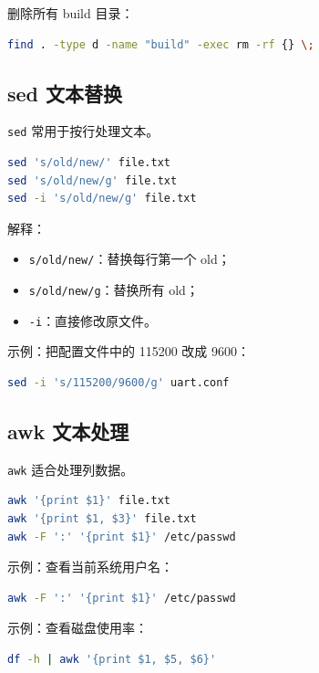 \documentclass[UTF8,a4paper,12pt]{ctexart}
\begin{document}
删除所有 build 目录：

\begin{lstlisting}[language=bash]
find . -type d -name "build" -exec rm -rf {} \;
\end{lstlisting}

\subsection{sed 文本替换}

\texttt{sed} 常用于按行处理文本。

\begin{lstlisting}[language=bash]
sed 's/old/new/' file.txt
sed 's/old/new/g' file.txt
sed -i 's/old/new/g' file.txt
\end{lstlisting}

解释：
\begin{itemize}
    \item \texttt{s/old/new/}：替换每行第一个 old；
    \item \texttt{s/old/new/g}：替换所有 old；
    \item \texttt{-i}：直接修改原文件。
\end{itemize}

示例：把配置文件中的 115200 改成 9600：

\begin{lstlisting}[language=bash]
sed -i 's/115200/9600/g' uart.conf
\end{lstlisting}

\subsection{awk 文本处理}

\texttt{awk} 适合处理列数据。

\begin{lstlisting}[language=bash]
awk '{print $1}' file.txt
awk '{print $1, $3}' file.txt
awk -F ':' '{print $1}' /etc/passwd
\end{lstlisting}

示例：查看当前系统用户名：

\begin{lstlisting}[language=bash]
awk -F ':' '{print $1}' /etc/passwd
\end{lstlisting}

示例：查看磁盘使用率：

\begin{lstlisting}[language=bash]
df -h | awk '{print $1, $5, $6}'
\end{lstlisting}
\end{document}
